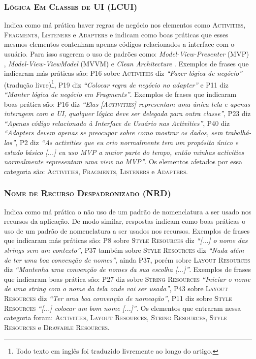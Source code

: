 \subsubsection{\textsc{Lógica Em Classes de UI (LCUI)}}
Indica como má prática haver regras de negócio nos elementos como \textsc{Activities}, \textsc{Fragments}, \textsc{Listeners} e \textsc{Adapters} e indicam como boas práticas que esses mesmos elementos contenham apenas códigos relacionados a interface com o usuário. Para isso sugerem o uso de padrões como: \textit{Model-View-Presenter} (MVP) \cite{MartinFowlerGUIArchitectures, WikipediaMVP}, \textit{Model-View-ViewModel} (MVVM) \cite{WikipediaMVVM} e \textit{Clean Architecture} \cite{CleanArchitecture}. Exemplos de frases que indicaram más práticas são: P16 sobre \textsc{Activities} diz \textit{``Fazer lógica de negócio''} (tradução livre)\footnote{Todo texto em inglês foi traduzido livremente ao longo do artigo.}, P19 diz \textit{``Colocar regra de negócio no adapter''} e P11 diz \textit{``Manter lógica de negócio em Fragments''}. Exemplos de frases que indicaram boas prática são: P16 diz \textit{``Elas [\textsc{Activities}] representam uma única tela e apenas interagem com a UI, qualquer lógica deve ser delegada para outra classe''}, P23 diz \textit{``Apenas código relacionado à Interface de Usuário nas Activities''}, P40 diz \textit{``Adapters devem apenas se preocupar sobre como mostrar os dados, sem trabalhá-los''}, P2 diz \textit{``As activities que eu crio normalmente tem um propósito único e estado básico [...] eu uso MVP a maior parte do tempo, então minhas activities normalmente representam uma view no MVP''}. Os elementos afetados por essa categoria são: \textsc{Activities}, \textsc{Fragments}, \textsc{Listeners} e \textsc{Adapters}. 

\subsubsection{\textsc{Nome de Recurso Despadronizado (NRD)}}
Indica como má prática o não uso de um padrão de nomenclatura a ser usado nos recursos da aplicação. De modo similar, respostas indicam como boas práticas o uso de um padrão de nomenclatura a ser usados nos recursos. Exemplos de frases que indicaram más práticas são: P8 sobre \textsc{Style Resources} diz \textit{``[...] o nome das strings sem um contexto''}, P37 também sobre \textsc{Style Resources} diz \textit{``Nada além de ter uma boa convenção de nomes''}, ainda P37, porém sobre \textsc{Layout Resources} diz \textit{``Mantenha uma convenção de nomes da sua escolha [...]''}. Exemplos de frases que indicaram boas prática são: P27 diz sobre \textsc{String Resources} \textit{``Iniciar o nome de uma string com o nome da tela onde vai ser usada''}, P43 sobre \textsc{Layout Resources} diz \textit{``Ter uma boa convenção de nomeação''}, P11 diz sobre \textsc{Style Resources} \textit{``[...] colocar um bom nome [...]''}. Os elementos que entraram nessa categoria foram: \textsc{Activities}, \textsc{Layout Resources}, \textsc{String Resources}, \textsc{Style Resources} e \textsc{Drawable Resources}. 

